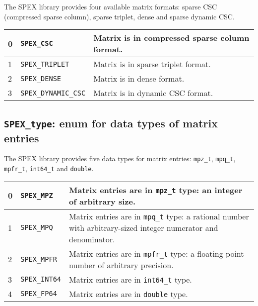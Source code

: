 \documentclass[12pt]{report}
\theoremstyle{definition}
\begin{document}
The SPEX library provides four available matrix formats: sparse CSC
(compressed sparse column), sparse triplet, dense and sparse dynamic CSC.

{\small
\begin{center}
\begin{tabular}{llp{4in}}
\hline
0 & \verb|SPEX_CSC| & Matrix is in compressed sparse column format. \\
\hline
1 & \verb|SPEX_TRIPLET|      & Matrix is in sparse triplet format. \\
\hline
2 & \verb|SPEX_DENSE|        & Matrix is in dense format.\\
\hline
3 & \verb|SPEX_DYNAMIC_CSC| & Matrix is in dynamic CSC format. \\
\hline
\end{tabular}
\label{tab:SPEX_kind}
\end{center}
}

\subsection{\texttt{SPEX\_type}: enum for data types of matrix entries}
\label{ss:SPEX_type}

The SPEX library provides five data types for matrix entries: \verb|mpz_t|,
\verb|mpq_t|, \verb|mpfr_t|, \verb|int64_t| and \verb|double|.

{\small
\begin{center}
\begin{tabular}{llp{4in}}
\hline
0 & \verb|SPEX_MPZ|     & Matrix entries are in \verb|mpz_t| type: an integer
                          of arbitrary size. \\
\hline
1 & \verb|SPEX_MPQ|     & Matrix entries are in \verb|mpq_t| type: a rational
                          number with arbitrary-sized integer numerator and
                          denominator. \\
\hline
2 & \verb|SPEX_MPFR|    & Matrix entries are in \verb|mpfr_t| type: a
                          floating-point number of arbitrary precision. \\
\hline
3 & \verb|SPEX_INT64|   & Matrix entries are in \verb|int64_t| type. \\
\hline
4 & \verb|SPEX_FP64|    & Matrix entries are in \verb|double| type. \\
\hline
\end{tabular}
\label{tab:SPEX_type}
\end{center}
}
\end{document}
